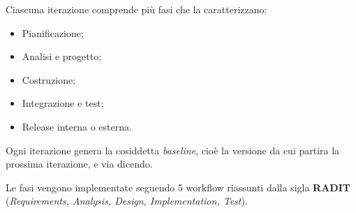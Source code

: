 \documentclass[a4paper,11pt]{article}
\begin{document}
Ciascuna iterazione comprende più fasi che la caratterizzano:
\begin{itemize}
	\item Pianificazione;
	\item Analisi e progetto;
	\item Costruzione;
	\item Integrazione e test;
	\item Release interna o esterna.
\end{itemize}

Ogni iterazione genera la cosiddetta \textit{baseline}, cioè la versione da cui partira la prossima iterazione, e via dicendo.

Le fasi vengono implementate seguendo 5 workflow riassunti dalla sigla \textbf{RADIT} (\textit{Requirements, Analysis, Design, Implementation, Test}).
\end{document}
